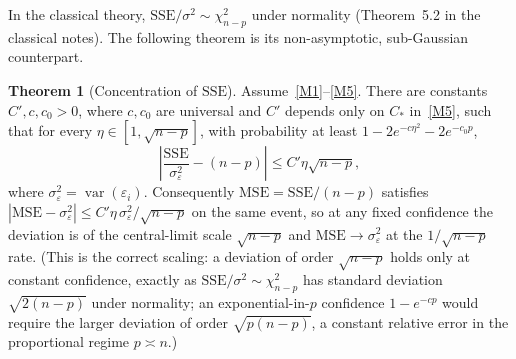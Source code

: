\documentclass[12pt,a4paper]{article}
\theoremstyle{definition}
\newtheorem{theorem}{Theorem}[section]
\DeclareMathOperator\var{var}
\newcommand{\SSE}{\mathrm{SSE}}
\newcommand{\MSE}{\mathrm{MSE}}
\begin{document}
In the classical theory, $\SSE/\sigma^2 \sim \chi^2_{n-p}$ under normality (Theorem~5.2 in the classical notes). The following theorem is its non-asymptotic, sub-Gaussian counterpart.

\begin{theorem}[Concentration of $\SSE$]\label{thm:sse-concentration}
Assume~\ref{M1}--\ref{M5}. There are constants $C', c, c_0 > 0$, where $c, c_0$ are universal and $C'$ depends only on $C_*$ in~\ref{M5}, such that for every $\eta \in [1, \sqrt{n-p}]$, with probability at least $1 - 2e^{-c\eta^2} - 2e^{-c_0 p}$,
\begin{equation}\label{eq:sse-concentration}
\left|\frac{\SSE}{\sigma_\varepsilon^2} - (n-p)\right| \leqslant C'\eta\sqrt{n-p},
\end{equation}
where $\sigma_\varepsilon^2 = \var(\varepsilon_i)$. Consequently $\MSE = \SSE/(n-p)$ satisfies $|\MSE - \sigma_\varepsilon^2| \leqslant C'\eta\,\sigma_\varepsilon^2/\sqrt{n-p}$ on the same event, so at any fixed confidence the deviation is of the central-limit scale $\sqrt{n-p}$ and $\MSE \to \sigma_\varepsilon^2$ at the $1/\sqrt{n-p}$ rate. (This is the correct scaling: a deviation of order $\sqrt{n-p}$ holds only at constant confidence, exactly as $\SSE/\sigma^2 \sim \chi^2_{n-p}$ has standard deviation $\sqrt{2(n-p)}$ under normality; an exponential-in-$p$ confidence $1 - e^{-cp}$ would require the larger deviation of order $\sqrt{p(n-p)}$, a constant relative error in the proportional regime $p \asymp n$.)
\end{theorem}
\end{document}
